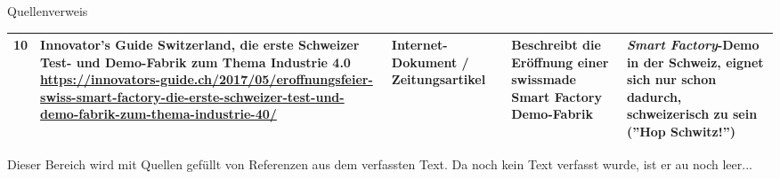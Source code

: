 \documentclass{article}
\def\SmartFactory{\textcolor{DarkestGray}{\textit{Smart Factory}}}
\begin{document}
\begin{Map}{Quellenverweis}
{\begin{tabular}{p{0.2cm}p{4.2cm}p{2cm}p{3.2cm}p{3.2cm}}
10&
Innovator's Guide Switzerland, die erste Schweizer Test- und Demo-Fabrik zum Thema Industrie 4.0 \url{https://innovators-guide.ch/2017/05/eroffnungsfeier-swiss-smart-factory-die-erste-schweizer-test-und-demo-fabrik-zum-thema-industrie-40/} &
Internet-Dokument / Zeitungsartikel & 
Beschreibt die Eröffnung einer swissmade Smart Factory Demo-Fabrik & 
\SmartFactory -Demo in der Schweiz, eignet sich nur schon dadurch, schweizerisch zu sein (''Hop Schwitz!'') \\\bottomrule
\end{tabular}}
\medskip
{}
Dieser Bereich wird mit Quellen gefüllt von Referenzen aus dem verfassten Text. Da noch kein Text verfasst wurde, ist er au noch leer...
\begingroup
\renewcommand{\section}[2]{}%


\endgroup
\end{Map}
\end{document}

